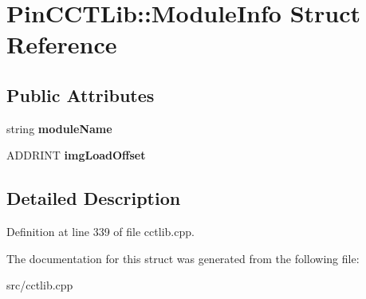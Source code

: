 \hypertarget{structPinCCTLib_1_1ModuleInfo}{\section{Pin\-C\-C\-T\-Lib\-:\-:Module\-Info Struct Reference}
\label{structPinCCTLib_1_1ModuleInfo}
}
\subsection*{Public Attributes}
\begin{DoxyCompactItemize}
\item 
\hypertarget{structPinCCTLib_1_1ModuleInfo_adae826841c578ab0b1a690ff28b3f07d}{string {\bfseries module\-Name}}\label{structPinCCTLib_1_1ModuleInfo_adae826841c578ab0b1a690ff28b3f07d}

\item 
\hypertarget{structPinCCTLib_1_1ModuleInfo_a084f7d9106b1c4997b2335b716f860f4}{A\-D\-D\-R\-I\-N\-T {\bfseries img\-Load\-Offset}}\label{structPinCCTLib_1_1ModuleInfo_a084f7d9106b1c4997b2335b716f860f4}

\end{DoxyCompactItemize}


\subsection{Detailed Description}


Definition at line 339 of file cctlib.\-cpp.



The documentation for this struct was generated from the following file\-:\begin{DoxyCompactItemize}
\item 
src/cctlib.\-cpp\end{DoxyCompactItemize}
